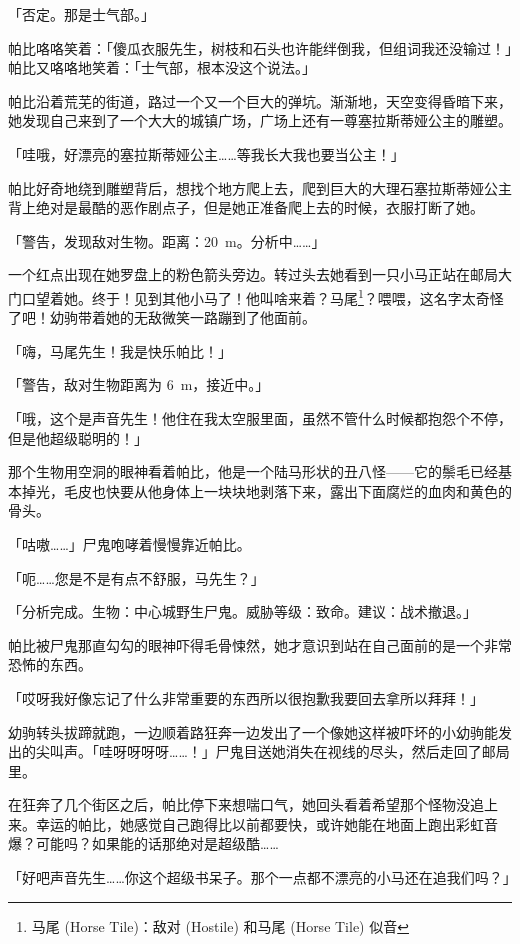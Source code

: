 「{\mt 否定。那是士气部。}」

帕比咯咯笑着：「傻瓜衣服先生，树枝和石头也许能绊倒我，但组词我还没输过！」帕比又咯咯地笑着：「士气部，根本没这个说法。」

帕比沿着荒芜的街道，路过一个又一个巨大的弹坑。渐渐地，天空变得昏暗下来，她发现自己来到了一个大大的城镇广场，广场上还有一尊塞拉斯蒂娅公主的雕塑。

「哇哦，好漂亮的塞拉斯蒂娅公主……等我长大我也要当公主！」

帕比好奇地绕到雕塑背后，想找个地方爬上去，爬到巨大的大理石塞拉斯蒂娅公主背上绝对是最酷的恶作剧点子，但是她正准备爬上去的时候，衣服打断了她。

「{\mt 警告，发现敌对生物。距离：\SI{20}{m}。分析中……}」

一个红点出现在她罗盘上的粉色箭头旁边。转过头去她看到一只小马正站在邮局大门口望着她。终于！见到其他小马了！他叫啥来着？马尾\footnote{马尾 (Horse Tile)：敌对 (Hostile) 和马尾 (Horse Tile) 似音}？喂喂，这名字太奇怪了吧！幼驹带着她的无敌微笑一路蹦到了他面前。

「嗨，马尾先生！我是快乐帕比！」

「{\mt 警告，敌对生物距离为 \SI{6}{m}，接近中。}」

「哦，这个是声音先生！他住在我太空服里面，虽然不管什么时候都抱怨个不停，但是他超级聪明的！」

那个生物用空洞的眼神看着帕比，他是一个陆马形状的丑八怪——它的鬃毛已经基本掉光，毛皮也快要从他身体上一块块地剥落下来，露出下面腐烂的血肉和黄色的骨头。

「咕嗷……」尸鬼咆哮着慢慢靠近帕比。

「呃……您是不是有点不舒服，马先生？」

「{\mt 分析完成。生物：中心城野生尸鬼。威胁等级：致命。建议：战术撤退。}」

帕比被尸鬼那直勾勾的眼神吓得毛骨悚然，她才意识到站在自己面前的是一个非常恐怖的东西。

「哎呀我好像忘记了什么非常重要的东西所以很抱歉我要回去拿所以拜拜！」

幼驹转头拔蹄就跑，一边顺着路狂奔一边发出了一个像她这样被吓坏的小幼驹能发出的尖叫声。「哇呀呀呀呀……！」尸鬼目送她消失在视线的尽头，然后走回了邮局里。

在狂奔了几个街区之后，帕比停下来想喘口气，她回头看着希望那个怪物没追上来。幸运的帕比，她感觉自己跑得比以前都要快，或许她能在地面上跑出彩虹音爆？可能吗？如果能的话那绝对是超级酷……

「好吧声音先生……你这个超级书呆子。那个一点都不漂亮的小马还在追我们吗？」

